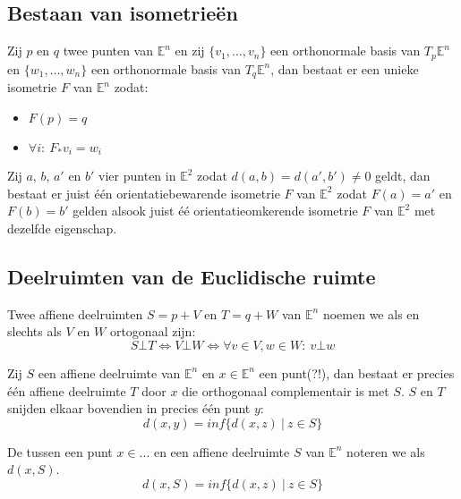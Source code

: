 \documentclass[main.tex]{subfiles}
\begin{document}
\subsection{Bestaan van isometrie\"en}
\label{sec:best-van-isom}

\begin{st}
  Zij $p$ en $q$ twee punten van $\mathbb{E}^{n}$ en zij $\{ v_{1},\dotsc,v_{n} \}$ een orthonormale basis van $T_{p}\mathbb{E}^{n}$ en $\{ w_{1},\dotsc,w_{n} \}$ een orthonormale basis van $T_{q}\mathbb{E}^{n}$, dan bestaat er een unieke isometrie $F$ van $\mathbb{E}^{n}$ zodat:
  \begin{itemize}
  \item $F(p) = q$
  \item $\forall i:\ F_{*}v_{i} = w_{i}$
  \end{itemize}
\end{st}

\begin{gev}
  Zij $a$, $b$, $a'$ en $b'$ vier punten in $\mathbb{E}^{2}$ zodat $d(a,b) = d(a',b') \neq 0$ geldt, dan bestaat er juist \'e\'en orientatiebewarende isometrie $F$ van $\mathbb{E}^{2}$ zodat $F(a) = a'$ en $F(b) = b'$ gelden alsook juist \'e\'e orientatieomkerende isometrie $F$ van $\mathbb{E}^{2}$ met dezelfde eigenschap.
\end{gev}

\subsection{Deelruimten van de Euclidische ruimte}
\label{sec:deelruimten-van-de}

\begin{de}
  Twee affiene deelruimten $S=p+V$ en $T=q+W$ van $\mathbb{E}^{n}$ noemen we  als en slechts als $V$ en $W$ ortogonaal zijn:
  \[ S \bot T \Leftrightarrow V \bot W \Leftrightarrow \forall v \in V, w \in W:\ v \bot w \]
\end{de}

\begin{st}
  Zij $S$ een affiene deelruimte van $\mathbb{E}^{n}$ en $x\in \mathbb{E}^{n}$ een punt(?!), dan bestaat er precies \'e\'en affiene deelruimte $T$ door $x$ die orthogonaal complementair is met $S$.
  $S$ en $T$ snijden elkaar bovendien in precies \'e\'en punt $y$:
  \[ d(x,y) = inf\{ d(x,z) \ |\ z \in S  \} \]
\end{st}

\begin{de}
  De  tussen een punt $x\in ...$ en een affiene deelruimte $S$ van $\mathbb{E}^{n}$ noteren we als $d(x,S)$.
  \[ d(x,S) = inf\{ d(x,z)\ |\ z \in S \} \]
\end{de}
\end{document}

